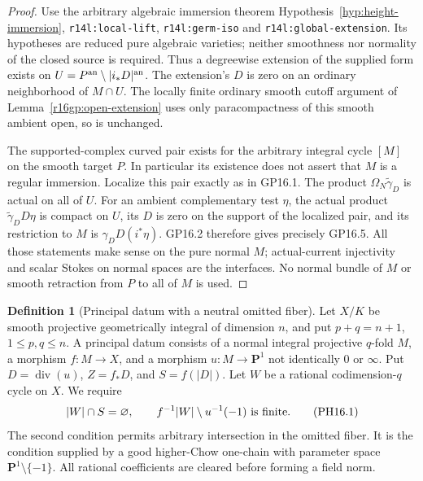 \documentclass[11pt,a4paper]{article}
\theoremstyle{definition}
\newtheorem{definition}[theorem]{Definition}
\theoremstyle{remark}
\numberwithin{equation}{section}
\begin{document}
\begin{proof}
Use the arbitrary algebraic immersion theorem
Hypothesis~\ref{hyp:height-immersion},
\texttt{r14l:local-lift}, \texttt{r14l:germ-iso} and
\texttt{r14l:global-extension}.  Its hypotheses are reduced pure
algebraic varieties; neither smoothness nor normality of the closed
source is required.  Thus a degreewise extension of the supplied form
exists on $U=P^{\rm an}\setminus|i_*D|^{\rm an}$.  The extension's
$D$ is zero on an ordinary neighborhood of $M\cap U$.  The locally
finite ordinary smooth cutoff argument of
Lemma~\ref{r16gp:open-extension} uses only paracompactness of this
smooth ambient open, so is unchanged.

The supported-complex curved pair exists for the arbitrary
integral cycle $[M]$ on the smooth target $P$.  In particular its
existence does not assert that $M$ is a regular immersion.  Localize
this pair exactly as in GP16.1.  The product
$\Omega_N\widetilde\gamma_D$ is actual on all of $U$.
For an ambient complementary test $\eta$, the actual product
$\widetilde\gamma_D D\eta$ is compact on $U$, its $D$ is zero
on the support of the localized pair, and its restriction to $M$
is $\gamma_D D(i^*\eta)$.  GP16.2 therefore gives precisely
GP16.5.  All those statements make sense on the pure normal $M$;
actual-current injectivity and scalar Stokes on normal spaces are
the interfaces.  No normal bundle of $M$ or smooth retraction
from $P$ to all of $M$ is used.
\end{proof}

\begin{definition}[Principal datum with a neutral omitted fiber]
\label{r16ph:datum}
Let $X/K$ be smooth projective geometrically integral of dimension
$n$, and put $p+q=n+1$, $1\le p,q\le n$.
A principal datum consists of a normal integral projective
$q$-fold $M$, a morphism $f:M\to X$, and a morphism
$u:M\to\mathbf P^1$ not identically $0$ or $\infty$.
Put $D=\operatorname{div}(u)$, $Z=f_*D$, and $S=f(|D|)$.
Let $W$ be a rational codimension-$q$ cycle on $X$.  We require
\[
 |W|\cap S=\varnothing,\qquad
 f^{-1}|W|\setminus u^{-1}(-1)\ \hbox{is finite}.
 \tag{PH16.1}\label{r16ph:position}
\]
The second condition permits arbitrary intersection in the omitted
fiber.  It is the condition supplied by a good higher-Chow
one-chain with parameter space $\mathbf P^1\setminus\{-1\}$.
All rational coefficients are cleared before forming a field norm.
\end{definition}
\end{document}
